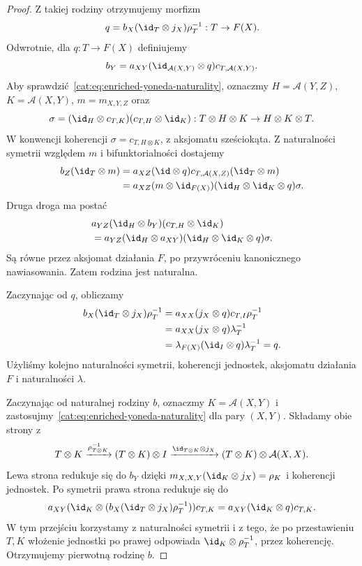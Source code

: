 \begin{proof}
Z takiej rodziny otrzymujemy morfizm
\[
 q=b_X(\id_T\otimes j_X)\rho_T^{-1}:T\to F(X).
\]
Odwrotnie, dla $q:T\to F(X)$ definiujemy
\[
 b_Y=a_{XY}(\id_{\mathcal A(X,Y)}\otimes q)c_{T,\mathcal A(X,Y)}.
\]
Aby sprawdzić~\eqref{cat:eq:enriched-yoneda-naturality}, oznaczmy $H=\mathcal A(Y,Z)$, $K=\mathcal A(X,Y)$, $m=m_{X,Y,Z}$ oraz
\[
 \sigma=(\id_H\otimes c_{T,K})(c_{T,H}\otimes\id_K):
 T\otimes H\otimes K\to H\otimes K\otimes T.
\]
W konwencji koherencji $\sigma=c_{T,H\otimes K}$, z aksjomatu sześciokąta. Z naturalności symetrii względem $m$ i bifunktorialności dostajemy
\[
\begin{aligned}
 b_Z(\id_T\otimes m)
 &=a_{XZ}(\id\otimes q)c_{T,\mathcal A(X,Z)}
      (\id_T\otimes m)\\
 &=a_{XZ}(m\otimes\id_{F(X)})
      (\id_H\otimes\id_K\otimes q)\sigma.
\end{aligned}
\]
Druga droga ma postać
\[
\begin{aligned}
 &a_{YZ}(\id_H\otimes b_Y)(c_{T,H}\otimes\id_K)\\
 &=a_{YZ}(\id_H\otimes a_{XY})
     (\id_H\otimes\id_K\otimes q)\sigma.
\end{aligned}
\]
Są równe przez aksjomat działania $F$, po przywróceniu kanonicznego nawiasowania. Zatem rodzina jest naturalna.

Zaczynając od $q$, obliczamy
\[
\begin{aligned}
 b_X(\id_T\otimes j_X)\rho_T^{-1}
 &=a_{XX}(j_X\otimes q)c_{T,I}\rho_T^{-1}\\
 &=a_{XX}(j_X\otimes q)\lambda_T^{-1}\\
 &=\lambda_{F(X)}(\id_I\otimes q)\lambda_T^{-1}
 =q.
\end{aligned}
\]
Użyliśmy kolejno naturalności symetrii, koherencji jednostek, aksjomatu działania $F$ i naturalności $\lambda$.

Zaczynając od naturalnej rodziny $b$, oznaczmy $K=\mathcal A(X,Y)$ i zastosujmy~\eqref{cat:eq:enriched-yoneda-naturality} dla pary $(X,Y)$. Składamy obie strony z
\[
 T\otimes K\xrightarrow{\rho_{T\otimes K}^{-1}}
 (T\otimes K)\otimes I\xrightarrow{\id_{T\otimes K}\otimes j_X}
 (T\otimes K)\otimes\mathcal A(X,X).
\]
Lewa strona redukuje się do $b_Y$ dzięki
$m_{X,X,Y}(\id_K\otimes j_X)=\rho_K$ i koherencji jednostek. Po symetrii prawa strona redukuje się do
\[
 a_{XY}(\id_K\otimes (b_X(\id_T\otimes j_X)\rho_T^{-1}))
 c_{T,K}=a_{XY}(\id_K\otimes q)c_{T,K}.
\]
W tym przejściu korzystamy z naturalności symetrii i z tego, że po przestawieniu $T,K$ włożenie jednostki po prawej odpowiada $\id_K\otimes\rho_T^{-1}$, przez koherencję. Otrzymujemy pierwotną rodzinę $b$.


\end{proof}
